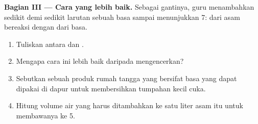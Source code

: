 \begin{problem}
\medskip
\noindent\textbf{Bagian III --- Cara yang lebih baik.}
Sebagai gantinya, guru menambahkan sedikit demi sedikit larutan sebuah
basa sampai  menunjukkan 7:   dari asam bereaksi
dengan   dari basa.
\begin{enumerate}[resume]
  \item Tuliskan  antara   dan  .
  \item Mengapa cara ini lebih baik daripada mengencerkan?
  \item Sebutkan sebuah produk rumah tangga yang bersifat basa yang dapat
        dipakai di dapur untuk membersihkan tumpahan kecil cuka.
  \item Hitung volume air yang harus ditambahkan ke satu liter asam itu
        untuk membawanya ke  5.
\end{enumerate}
\end{problem}
